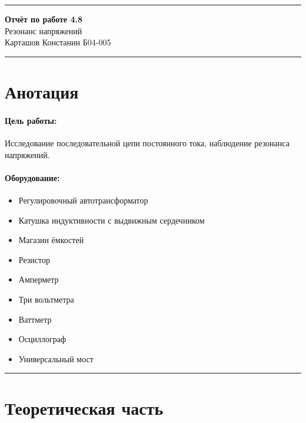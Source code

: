 \documentclass[a4paper,12pt]{article} %
\begin{document}


\hrule 	
\medskip
\begin{raggedright}
{\large \textbf{Отчёт по работе 4.8}}
\\
\medskip
{\Large Резонанс напряжений} 
\\
\medskip
{\large Карташов Констанин Б04-005}
\medskip
\hrule
\medskip
\end{raggedright}


\section{Анотация}

\paragraph{Цель работы:} 
Исследование последовательной цепи постоянного тока, наблюдение резонанса напряжений.

\paragraph{Оборудование:}
\begin{itemize}
\renewcommand{\labelitemi}{$\triangleright$}
\itemsep0em
\item Регулировочный автотрансформатор
\item Катушка индуктивности с выдвижным сердечником	
\item Магазин ёмкостей
\item Резистор
\item Амперметр
\item Три вольтметра
\item Ваттметр
\item Осциллограф
\item Универсальный мост
\end{itemize}


\medskip\hrule\medskip

\section{Теоретическая часть}
\end{document}
